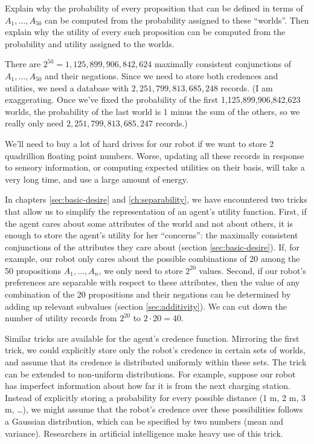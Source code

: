 \begin{exercise}{3}
  Explain why the probability of every proposition that can be defined in terms
  of $A_1,\ldots,A_{50}$ can be computed from the probability assigned to these
  ``worlds''. Then explain why the utility of every such proposition can be
  computed from the probability and utility assigned to the worlds.
\end{exercise}

There are $2^{50} = 1,125,899,906,842,624$ maximally consistent conjunctions of
$A_1,\ldots,A_{50}$ and their negations. Since we need to store both credences
and utilities, we need a database with $2,251,799,813,685,248$ records. (I am
exaggerating. Once we've fixed the probability of the first
1,125,899,906,842,623 worlds, the probability of the last world is 1 minus the
sum of the others, so we really only need $2,251,799,813,685,247$ records.)

We'll need to buy a lot of hard drives for our robot if we want to store 2
quadrillion floating point numbers. Worse, updating all these records in
response to sensory information, or computing expected utilities on their basis,
will take a very long time, and use a large amount of energy.

In chapters \ref{sec:basic-desire} and \ref{ch:separability}, we have
encountered two tricks that allow us to simplify the representation of an
agent's utility function. First, if the agent cares about some attributes of the
world and not about others, it is enough to store the agent's utility for her
``concerns'': the maximally consistent conjunctions of the attributes they care
about (section \ref{sec:basic-desire}). If, for example, our robot only cares
about the possible combinations of 20 among the 50 propositions
$A_1,\ldots,A_n$, we only need to store $2^{20}$ values. Second, if our robot's
preferences are separable with respect to these attributes, then the value of
any combination of the 20 propositions and their negations can be determined by
adding up relevant subvalues (section \ref{sec:additivity}). We can cut down
the number of utility records from $2^{20}$ to $2 \cdot 20 = 40$.

Similar tricks are available for the agent's credence function. Mirroring the
first trick, we could explicitly store only the robot's credence in certain sets
of worlds, and assume that its credence is distributed uniformly within these
sets. The trick can be extended to non-uniform distributions. For example,
suppose our robot has imperfect information about how far it is from the next
charging station. Instead of explicitly storing a probability for every possible
distance (1 m, 2 m, 3 m, \ldots), we might assume that the robot's credence over
these possibilities follows a Gaussian distribution, which can be specified by
two numbers (mean and variance). Researchers in artificial intelligence make
heavy use of this trick.

